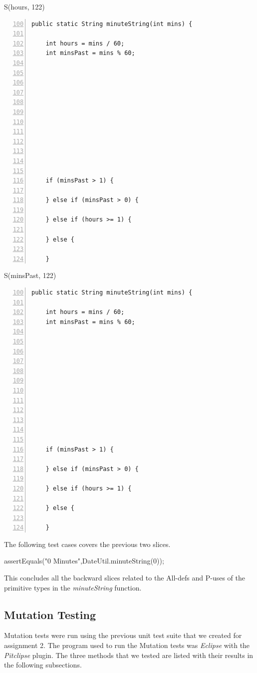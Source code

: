 \documentclass[fontsize=12pt,paper=letter,twoside]{scrartcl}
\begin{document}
S(hours, 122)
\begin{lstlisting}[numbers=left,firstnumber=100]
  public static String minuteString(int mins) {
    
    int hours = mins / 60;
    int minsPast = mins % 60;
    
    
    
    
    
     
    
     
    
     
    

    if (minsPast > 1) {
      
    } else if (minsPast > 0) {
      
    } else if (hours >= 1) {
    
    } else {
    
    }
\end{lstlisting}
S(minsPast, 122)
\begin{lstlisting}[numbers=left,firstnumber=100]
  public static String minuteString(int mins) {
    
    int hours = mins / 60;
    int minsPast = mins % 60;
    
    
    
    
    
     
    
     
    
     
    

    if (minsPast > 1) {
      
    } else if (minsPast > 0) {
      
    } else if (hours >= 1) {
    
    } else {
    
    }
\end{lstlisting}
The following test cases covers the previous two slices.
\begin{code}
assertEquals("0 Minutes",DateUtil.minuteString(0));
\end{code}

This concludes all the backward slices related to the All-defs and P-uses of the primitive types in the \emph{minuteString} function.

\newpage
\subsection{Mutation Testing}
Mutation tests were run using the previous unit test suite that we created for assignment 2. The program used to run the Mutation tests was \emph{Eclipse} with the \emph{Pitclipse} plugin. The three methods that we tested are listed with their results in the following subsections. 
\end{document}
